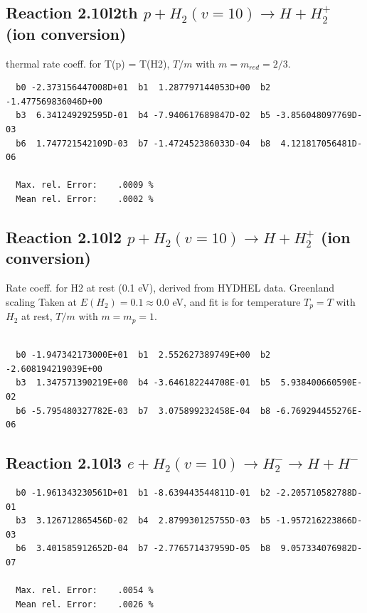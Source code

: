 \documentclass[12pt,dvipdfmx]{article}
\begin{document}
\subsection{
Reaction 2.10l2th
$ p + H_2(v=10) \rightarrow H + H_2^+$ (ion conversion)
}
thermal rate coeff. for T(p) = T(H2),
$T/m$ with $m=m_{red}=2/3$.

\begin{small}\begin{verbatim}
  b0 -2.373156447008D+01  b1  1.287797144053D+00  b2 -1.477569836046D+00
  b3  6.341249292595D-01  b4 -7.940617689847D-02  b5 -3.856048097769D-03
  b6  1.747721542109D-03  b7 -1.472452386033D-04  b8  4.121817056481D-06

  Max. rel. Error:    .0009 %
  Mean rel. Error:    .0002 %
\end{verbatim}\end{small}

\subsection{
Reaction 2.10l2
$ p + H_2(v=10) \rightarrow H + H_2^+$ (ion conversion)
}
Rate coeff. for H2 at rest (0.1 eV), derived from HYDHEL data. Greenland scaling
Taken at $E(H_2) = 0.1 \approx 0.0$ eV,  and fit is for temperature $T_p=T$ with $H_2$ at rest,
$T/m$ with $m=m_p=1$.

\begin{small}\begin{verbatim}

  b0 -1.947342173000E+01  b1  2.552627389749E+00  b2 -2.608194219039E+00
  b3  1.347571390219E+00  b4 -3.646182244708E-01  b5  5.938400660590E-02
  b6 -5.795480327782E-03  b7  3.075899232458E-04  b8 -6.769294455276E-06

\end{verbatim}\end{small}

\newpage

\subsection{
Reaction 2.10l3
 $ e + H_2(v=10) \rightarrow H_2^- \rightarrow H + H^-$
}


\begin{small}\begin{verbatim}
  b0 -1.961343230561D+01  b1 -8.639443544811D-01  b2 -2.205710582788D-01
  b3  3.126712865456D-02  b4  2.879930125755D-03  b5 -1.957216223866D-03
  b6  3.401585912652D-04  b7 -2.776571437959D-05  b8  9.057334076982D-07

  Max. rel. Error:    .0054 %
  Mean rel. Error:    .0026 %
\end{verbatim}\end{small}
\end{document}
